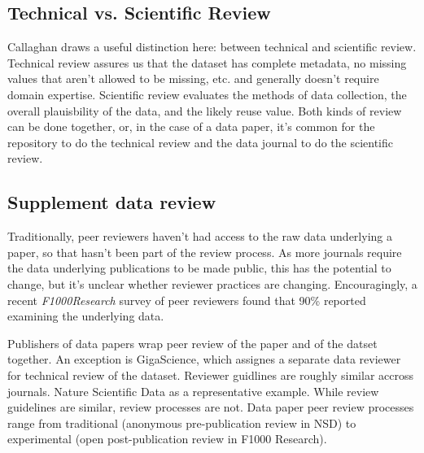 \documentclass[10pt,a4paper,twocolumn]{article}
\begin{document}


\subsection*{Technical vs. Scientific Review}
Callaghan draws a useful distinction here: between technical and scientific review. \cite{callaghan_making_2012}
Technical review assures us that the dataset has complete metadata, no missing values that aren't allowed to be missing, etc. and generally doesn't require domain expertise. 
Scientific review evaluates the methods of data collection, the overall plauisbility of the data, and the likely reuse value. 
Both kinds of review can be done together, or, in the case of a data paper, it's common for the repository to do the technical review and the data journal to do the scientific review.

\subsection*{Supplement data review}
Traditionally, peer reviewers haven't had access to the raw data underlying a paper, so that hasn't been part of the review process.
As more journals require the data underlying publications to be made public, this has the potential to change, but it's unclear whether reviewer practices are changing.
Encouragingly, a recent \emph{F1000Research} survey of peer reviewers found that 90\% reported examining the underlying data.



Publishers of data papers wrap peer review of the paper and of the datset together. 
An exception is GigaScience\cite{gigascience}, which assignes a separate data reviewer for technical review of the dataset. 
Reviewer guidlines are roughly similar accross journals. Nature Scientific Data as a representative example.
While review guidelines are similar, review processes are not. 
Data paper peer review processes range from traditional (anonymous pre-publication review in NSD) to experimental (open post-publication review in F1000 Research).
\end{document}
